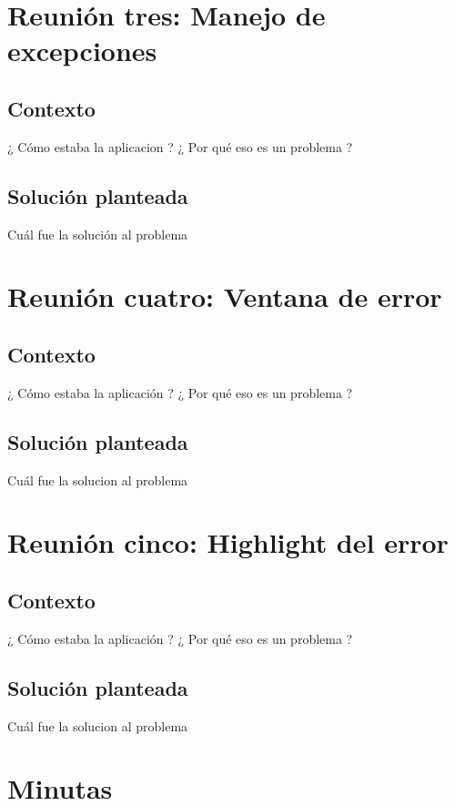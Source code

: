 \documentclass[a4paper,oneside,10pt]{article}
\begin{document}
\section{Reuni\'on tres: Manejo de excepciones}

\subsection{Contexto}
¿ C\'omo estaba la aplicacion ? ¿ Por qu\'e eso es un problema ?

\subsection{Soluci\'on planteada}
Cu\'al fue la soluci\'on al problema

\section{Reuni\'on cuatro: Ventana de error}

\subsection{Contexto}
¿ C\'omo estaba la aplicaci\'on ? ¿ Por qu\'e eso es un problema ?

\subsection{Soluci\'on planteada}
Cu\'al fue la solucion al problema

\section{Reuni\'on cinco: Highlight del error}

\subsection{Contexto}
¿ C\'omo estaba la aplicaci\'on ? ¿ Por qu\'e eso es un problema ?

\subsection{Soluci\'on planteada}
Cu\'al fue la solucion al problema

\section{Minutas}
\end{document}
